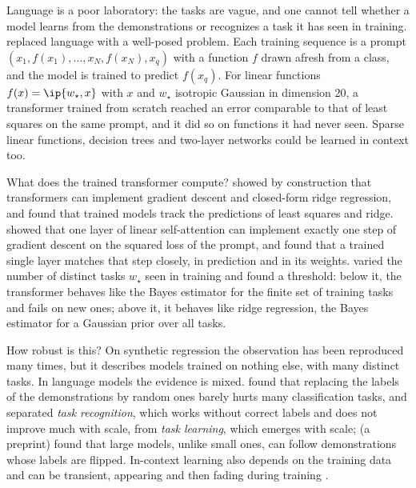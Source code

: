 \begin{refsection}
Language is a poor laboratory: the tasks are vague, and one cannot tell whether a model learns from the demonstrations or recognizes a task it has seen in training. \textcite{GargEtAl2022} replaced language with a well-posed problem. Each training sequence is a prompt $(x_1,f(x_1),\dots,x_N,f(x_N),x_q)$ with a function $f$ drawn afresh from a class, and the model is trained to predict $f(x_q)$. For linear functions $f(x)=\ip{w_\star,x}$ with $x$ and $w_\star$ isotropic Gaussian in dimension $20$, a transformer trained from scratch reached an error comparable to that of least squares on the same prompt, and it did so on functions it had never seen. Sparse linear functions, decision trees and two-layer networks could be learned in context too.

What does the trained transformer compute? \textcite{AkyurekEtAl2023} showed by construction that transformers can implement gradient descent and closed-form ridge regression, and found that trained models track the predictions of least squares and ridge. \textcite{VonOswaldEtAl2023} showed that one layer of linear self-attention can implement exactly one step of gradient descent on the squared loss of the prompt, and found that a trained single layer matches that step closely, in prediction and in its weights. \textcite{RaventosEtAl2023} varied the number of distinct tasks $w_\star$ seen in training and found a threshold: below it, the transformer behaves like the Bayes estimator for the finite set of training tasks and fails on new ones; above it, it behaves like ridge regression, the Bayes estimator for a Gaussian prior over all tasks.


How robust is this? On synthetic regression the observation has been reproduced many times, but it describes models trained on nothing else, with many distinct tasks. In language models the evidence is mixed. \textcite{MinEtAl2022} found that replacing the labels of the demonstrations by random ones barely hurts many classification tasks, and \textcite{PanEtAl2023} separated \emph{task recognition}, which works without correct labels and does not improve much with scale, from \emph{task learning}, which emerges with scale; \textcite{WeiEtAl2023} (a preprint) found that large models, unlike small ones, can follow demonstrations whose labels are flipped. In-context learning also depends on the training data \parencite{ChanEtAl2022} and can be transient, appearing and then fading during training \parencite{SinghEtAl2023}.


\end{refsection}
